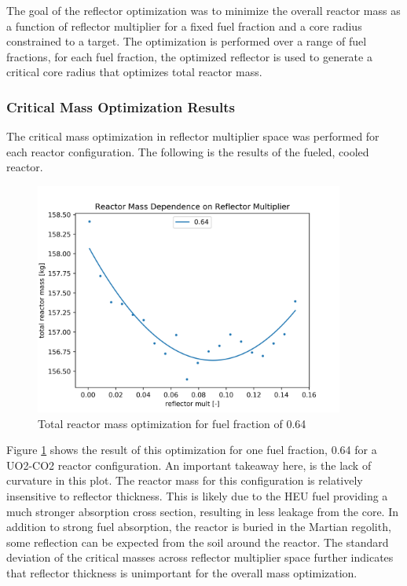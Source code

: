 The goal of the reflector optimization was to minimize the overall reactor mass
as a function of reflector multiplier for a fixed fuel fraction and a core
radius constrained to a \keff target. The optimization is performed over a range
of fuel fractions, for each fuel fraction, the optimized reflector is used to
generate a critical core radius that optimizes total reactor mass.


\subsubsection{Critical Mass Optimization Results}

The critical mass optimization in reflector multiplier space was performed for
each reactor configuration. The following is the results of the \uox fueled,
\codiox cooled reactor.

\begin{figure}[h]
    \centering
    \includegraphics[width=4in]{../images/mass_mult_064.png}
\caption{Total reactor mass optimization for fuel fraction of 0.64}
\label{fig:mass_mult_one}
\end{figure}

Figure \ref{fig:mass_mult_one} shows the result of this optimization for one
fuel fraction, 0.64 for a UO2-CO2 reactor configuration. An important takeaway here, is the lack of curvature in
this plot. The reactor mass for this configuration is relatively insensitive to
reflector thickness. This is likely due to the HEU fuel providing a much
stronger absorption cross section, resulting in less leakage from the core. In
addition to strong fuel absorption, the reactor is buried in the Martian
regolith, some reflection can be expected from the soil around the reactor.
The standard deviation of the critical masses across reflector multiplier space
further indicates that reflector thickness is unimportant for the overall mass
optimization.

